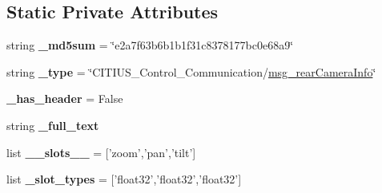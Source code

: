\subsection*{\-Static \-Private \-Attributes}
\begin{DoxyCompactItemize}
\item 
\hypertarget{class_c_i_t_i_u_s___control___communication_1_1msg_1_1__msg__rear_camera_info_1_1msg__rear_camera_info_a9f6fdacbfdf4235bfffac79e2943bb21}{string {\bfseries \-\_\-md5sum} = \char`\"{}e2a7f63b6b1b1f31c8378177bc0e68a9\char`\"{}}\label{class_c_i_t_i_u_s___control___communication_1_1msg_1_1__msg__rear_camera_info_1_1msg__rear_camera_info_a9f6fdacbfdf4235bfffac79e2943bb21}

\item 
\hypertarget{class_c_i_t_i_u_s___control___communication_1_1msg_1_1__msg__rear_camera_info_1_1msg__rear_camera_info_a8b6654d3f14b104ad8f6abedcc47a7d3}{string {\bfseries \-\_\-type} = \char`\"{}\-C\-I\-T\-I\-U\-S\-\_\-\-Control\-\_\-\-Communication/\hyperlink{class_c_i_t_i_u_s___control___communication_1_1msg_1_1__msg__rear_camera_info_1_1msg__rear_camera_info}{msg\-\_\-rear\-Camera\-Info}\char`\"{}}\label{class_c_i_t_i_u_s___control___communication_1_1msg_1_1__msg__rear_camera_info_1_1msg__rear_camera_info_a8b6654d3f14b104ad8f6abedcc47a7d3}

\item 
\hypertarget{class_c_i_t_i_u_s___control___communication_1_1msg_1_1__msg__rear_camera_info_1_1msg__rear_camera_info_a3023e617ea4bd8bddce3d83ecb3ceddd}{{\bfseries \-\_\-has\-\_\-header} = \-False}\label{class_c_i_t_i_u_s___control___communication_1_1msg_1_1__msg__rear_camera_info_1_1msg__rear_camera_info_a3023e617ea4bd8bddce3d83ecb3ceddd}

\item 
string {\bfseries \-\_\-full\-\_\-text}
\item 
\hypertarget{class_c_i_t_i_u_s___control___communication_1_1msg_1_1__msg__rear_camera_info_1_1msg__rear_camera_info_a3ab5bf3984c9408ffa67dd83a711f3e4}{list {\bfseries \-\_\-\-\_\-slots\-\_\-\-\_\-} = \mbox{[}'zoom','pan','tilt'\mbox{]}}\label{class_c_i_t_i_u_s___control___communication_1_1msg_1_1__msg__rear_camera_info_1_1msg__rear_camera_info_a3ab5bf3984c9408ffa67dd83a711f3e4}

\item 
\hypertarget{class_c_i_t_i_u_s___control___communication_1_1msg_1_1__msg__rear_camera_info_1_1msg__rear_camera_info_a4909ff73868070fdae0b19ca062b25c6}{list {\bfseries \-\_\-slot\-\_\-types} = \mbox{[}'float32','float32','float32'\mbox{]}}\label{class_c_i_t_i_u_s___control___communication_1_1msg_1_1__msg__rear_camera_info_1_1msg__rear_camera_info_a4909ff73868070fdae0b19ca062b25c6}

\end{DoxyCompactItemize}


